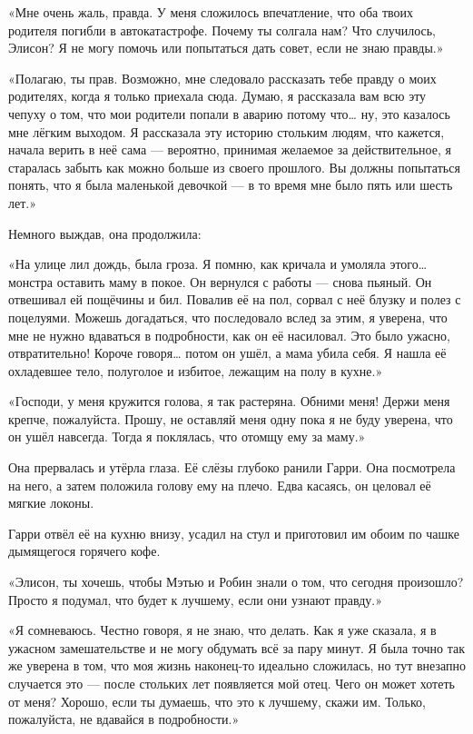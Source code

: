 \documentclass[a4paper,12pt]{book}
\begin{document}
\par
«Мне очень жаль, правда. У меня сложилось впечатление, что оба твоих родителя погибли в автокатастрофе. Почему ты солгала нам? Что случилось, Элисон? Я не могу помочь или попытаться дать совет, если не знаю правды.»
\par
«Полагаю, ты прав. Возможно, мне следовало рассказать тебе правду о моих родителях, когда я только приехала сюда. Думаю, я рассказала вам всю эту чепуху о том, что мои родители попали в аварию потому что… ну, это казалось мне лёгким выходом. Я рассказала эту историю стольким людям, что кажется, начала верить в неё сама — вероятно, принимая желаемое за действительное, я старалась забыть как можно больше из своего прошлого. Вы должны попытаться понять, что я была маленькой девочкой — в то время мне было пять или шесть лет.»
\par
Немного выждав, она продолжила:
\par
«На улице лил дождь, была гроза. Я помню, как кричала и умоляла этого… монстра оставить маму в покое. Он вернулся с работы — снова пьяный. Он отвешивал ей пощёчины и бил. Повалив её на пол, сорвал с неё блузку и полез с поцелуями. Можешь догадаться, что последовало вслед за этим, я уверена, что мне не нужно вдаваться в подробности, как он её насиловал. Это было ужасно, отвратительно! Короче говоря… потом он ушёл, а мама убила себя. Я нашла её охладевшее тело, полуголое и избитое, лежащим на полу в кухне.»
\par
«Господи, у меня кружится голова, я так растеряна. Обними меня! Держи меня крепче, пожалуйста. Прошу, не оставляй меня одну пока я не буду уверена, что он ушёл навсегда. Тогда я поклялась, что отомщу ему за маму.»
\par
Она прервалась и утёрла глаза. Её слёзы глубоко ранили Гарри. Она посмотрела на него, а затем положила голову ему на плечо. Едва касаясь, он целовал её мягкие локоны.
\par
Гарри отвёл её на кухню внизу, усадил на стул и приготовил им обоим по чашке дымящегося горячего кофе.
\par
«Элисон, ты хочешь, чтобы Мэтью и Робин знали о том, что сегодня произошло? Просто я подумал, что будет к лучшему, если они узнают правду.»
\par
«Я сомневаюсь. Честно говоря, я не знаю, что делать. Как я уже сказала, я в ужасном замешательстве и не могу обдумать всё за пару минут. Я была точно так же уверена в том, что моя жизнь наконец-то идеально сложилась, но тут внезапно случается это — после стольких лет появляется мой отец. Чего он может хотеть от меня? Хорошо, если ты думаешь, что это к лучшему, скажи им. Только, пожалуйста, не вдавайся в подробности.»
\end{document}
